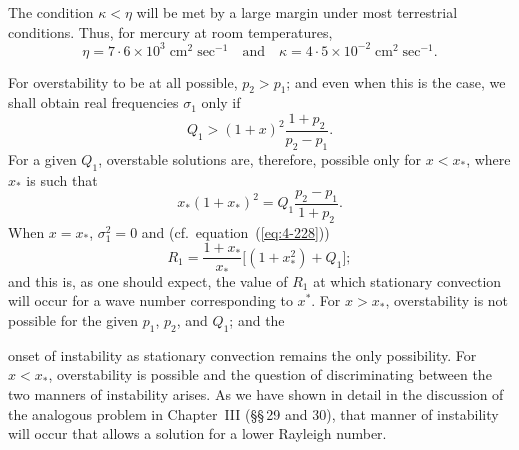 The condition $\kappa<\eta$ will be met by a large margin under most terrestrial conditions. Thus, for mercury at room temperatures,
\begin{equation}
\label{eq:4-234}
\eta = 7{\cdot}6\times 10^3\;\text{cm}^2\;\text{sec}^{-1} \quad\text{and}\quad \kappa = 4{\cdot}5\times 10^{-2}\;\text{cm}^2\;\text{sec}^{-1}.
\end{equation}

For overstability to be at all possible, $p_2>p_1$; and even when this is the case, we shall obtain real frequencies $\sigma_1$ only if
\begin{equation}
\label{eq:4-235}
Q_1 > (1+x)^2\frac{1+p_2}{p_2-p_1}.
\end{equation}
For a given $Q_1$, overstable solutions are, therefore, possible only for $x<x_*$, where $x_*$ is such that
\begin{equation}
\label{eq:4-236}
x_*(1+x_*)^2 = Q_1\frac{p_2-p_1}{1+p_2}.
\end{equation}
When $x=x_*$, $\sigma_1^2=0$ and (cf.\ equation~(\ref{eq:4-228}))
\begin{equation}
\label{eq:4-237}
R_1 = \frac{1+x_*}{x_*}\bigl[(1+x_*^2)+Q_1\bigr];
\end{equation}
and this is, as one should expect, the value of $R_1$ at which stationary convection will occur for a wave number corresponding to $x^*$. For $x>x_*$, overstability is not possible for the given $p_1$, $p_2$, and $Q_1$; and the


onset of instability as stationary convection remains the only possibility. For $x<x_*$, overstability is possible and the question of discriminating between the two manners of instability arises. As we have shown in detail in the discussion of the analogous problem in Chapter~III (\S\S\,29 and 30), that manner of instability will occur that allows a solution for a lower Rayleigh number.

